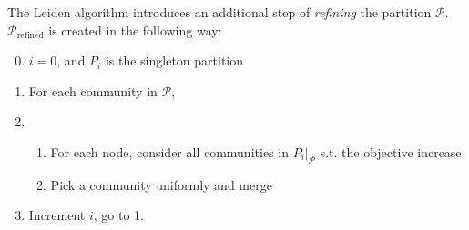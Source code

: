 \documentclass[../../main/main.tex]{subfiles}
\begin{document}
The Leiden algorithm introduces an additional step of \emph{refining} the partition $\mathcal{P}$.
$\mathcal{P}_{\text{refined}}$ is created in the following way:
\begin{enumerate}
	\setcounter{enumi}{-1}
	\item $i = 0$, and $P_i$ is the singleton partition
	\item For each community in $\mathcal{P}$,
	\item \begin{enumerate}
		      \item For each node, consider all communities in $P_i \big|_\mathcal{P}$ s.t. the objective increase
		      \item Pick a community uniformly and merge
	      \end{enumerate}
	\item Increment $i$, go to 1.
\end{enumerate}

\bibsub
\end{document}
